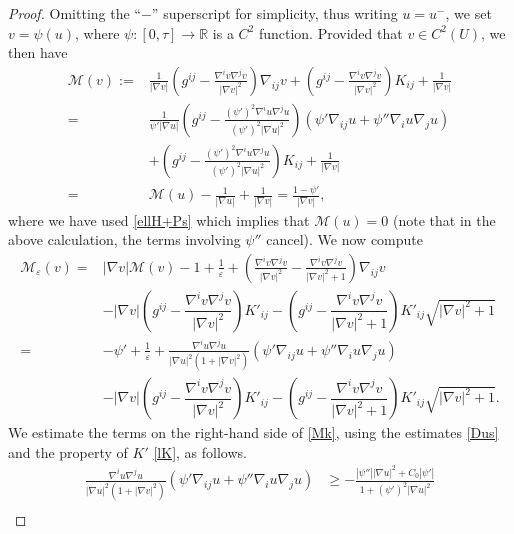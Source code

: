 \documentclass[11pt]{amsart}
\renewcommand{\epsilon}{\varepsilon}
\def\R{\mathbb{R}}
\def\e{\epsilon}
\def\t{\tau}
\begin{document}
\begin{proof}
Omitting the  ``$-$'' superscript for simplicity, thus writing $u=u^-$, we set $v=\psi(u)$, where $\psi:[0,\t]\to\R$ is a $C^2$ function. Provided that $v\in C^2(U)$, we then have
\begin{equation}\label{MvMueqn}
\begin{split}
\mathcal M(v):=&\frac{1}{|\nabla v|}\left(g^{ij}-\frac{\nabla^i v\nabla^j v}{|\nabla v|^2}\right)\nabla_{ij}v+\left(g^{ij}- \frac{\nabla^i v\nabla^j v}{|\nabla v|^2}\right) K_{ij} +\frac{1}{|\nabla v|}\\
=&\frac{1}{{\psi'|\nabla u|}}\left({g^{ij}}-\frac{(\psi')^2\nabla^i u\nabla^j u}{(\psi')^2|\nabla u|^2}\right)(\psi'\nabla_{ij}u+\psi''\nabla_i u\nabla_ju)\\
&+\left(g^{ij}- \frac{(\psi')^2\nabla^i u\nabla^j u}{(\psi')^2|\nabla u|^2}\right) K_{ij} +\frac{1}{|\nabla v|}\\
=&\mathcal M(u)-\frac{1}{|\nabla u|}+\frac{1}{|\nabla v|}=\frac{1-\psi'}{|\nabla v|},
\end{split}
\end{equation}
where we have used \eqref{ellH+Ps} which implies that $\mathcal M(u)=0$ (note that in the above calculation, the terms involving $\psi''$ cancel).
 We now compute  
\begin{equation}\label{Mk}\begin{split}\mathcal M_\e(v)=&|\nabla v| \mathcal M(v) -1+\frac{1}{\e}+\left(\frac{\nabla^iv\nabla^jv}{|\nabla v|^2}-\frac{\nabla^iv\nabla^jv}{|\nabla v|^2+1}\right)\nabla_{ij}v\\
&-|\nabla v|\left(g^{ij}-\dfrac{\nabla^iv \nabla^j v}{|\nabla v|^2}\right)K'_{ij}-\left(g^{ij}-\dfrac{\nabla^iv \nabla^j v}{|\nabla v|^2+1}\right)K'_{ij} \sqrt{|\nabla v|^2+1}\\
=&-\psi'+\frac1\e +\frac{\nabla^i u\nabla^j u}{|\nabla u|^2(1+|\nabla v|^2)}(\psi'\nabla_{ij}u+\psi''\nabla_i u\nabla _ju)\\
&-|\nabla v|\left(g^{ij}-\dfrac{\nabla^iv \nabla^j v}{|\nabla v|^2}\right)K'_{ij}-\left(g^{ij}-\dfrac{\nabla^iv \nabla^j v}{|\nabla v|^2+1}\right)K'_{ij} \sqrt{|\nabla v|^2+1}.
\end{split}
\end{equation}
We estimate the terms on the right-hand side of \eqref{Mk}, using the estimates \eqref{Dus} and the property of $K'$  \eqref{lK}, as follows.
\begin{equation}\label{term1}
\begin{split}
\frac{\nabla^i u\nabla^j u}{|\nabla u|^2(1+|\nabla v|^2)}(\psi'\nabla_{ij}u+\psi''\nabla_i u\nabla _ju)&\ge -\frac{|\psi''||\nabla u|^2+C_0|\psi'|}{1+(\psi')^2|\nabla u|^2}\\

\end{split}
\end{equation}
\end{proof}
\end{document}

